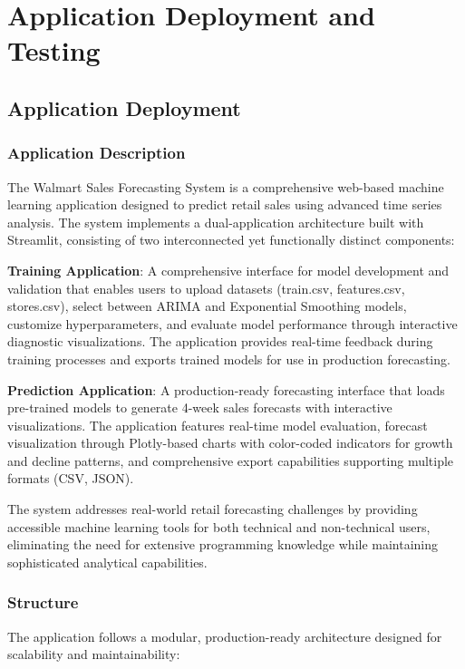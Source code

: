 \chapter{Application Deployment and Testing}

\section{Application Deployment}

\subsection{Application Description}

The Walmart Sales Forecasting System is a comprehensive web-based machine learning application designed to predict retail sales using advanced time series analysis. The system implements a dual-application architecture built with Streamlit, consisting of two interconnected yet functionally distinct components:

\textbf{Training Application}: A comprehensive interface for model development and validation that enables users to upload datasets (train.csv, features.csv, stores.csv), select between ARIMA and Exponential Smoothing models, customize hyperparameters, and evaluate model performance through interactive diagnostic visualizations. The application provides real-time feedback during training processes and exports trained models for use in production forecasting.

\textbf{Prediction Application}: A production-ready forecasting interface that loads pre-trained models to generate 4-week sales forecasts with interactive visualizations. The application features real-time model evaluation, forecast visualization through Plotly-based charts with color-coded indicators for growth and decline patterns, and comprehensive export capabilities supporting multiple formats (CSV, JSON).

The system addresses real-world retail forecasting challenges by providing accessible machine learning tools for both technical and non-technical users, eliminating the need for extensive programming knowledge while maintaining sophisticated analytical capabilities.

\subsection{Structure}

The application follows a modular, production-ready architecture designed for scalability and maintainability:

